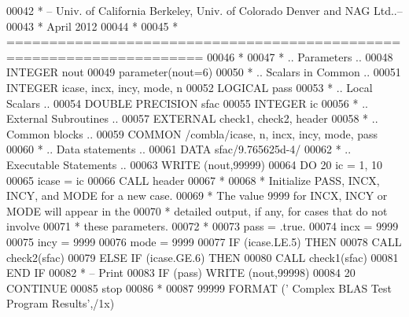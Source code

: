 \begin{DoxyCode}
00042 \textcolor{comment}{*  -- Univ. of California Berkeley, Univ. of Colorado Denver and NAG Ltd..--}
00043 \textcolor{comment}{*     April 2012}
00044 \textcolor{comment}{*}
00045 \textcolor{comment}{*  =====================================================================}
00046 \textcolor{comment}{*}
00047 \textcolor{comment}{*     .. Parameters ..}
00048       \textcolor{keywordtype}{INTEGER}          nout
00049       parameter(nout=6)
00050 \textcolor{comment}{*     .. Scalars in Common ..}
00051       \textcolor{keywordtype}{INTEGER}          icase, incx, incy, mode, n
00052       \textcolor{keywordtype}{LOGICAL}          pass
00053 \textcolor{comment}{*     .. Local Scalars ..}
00054       \textcolor{keywordtype}{DOUBLE PRECISION} sfac
00055       \textcolor{keywordtype}{INTEGER}          ic
00056 \textcolor{comment}{*     .. External Subroutines ..}
00057       \textcolor{keywordtype}{EXTERNAL}         check1, check2, header
00058 \textcolor{comment}{*     .. Common blocks ..}
00059       \textcolor{keyword}{COMMON}           /combla/icase, n, incx, incy, mode, pass
00060 \textcolor{comment}{*     .. Data statements ..}
00061       \textcolor{keyword}{DATA}             sfac/9.765625d-4/
00062 \textcolor{comment}{*     .. Executable Statements ..}
00063       \textcolor{keyword}{WRITE} (nout,99999)
00064       \textcolor{keywordflow}{DO} 20 ic = 1, 10
00065          icase = ic
00066          \textcolor{keyword}{CALL }header
00067 \textcolor{comment}{*}
00068 \textcolor{comment}{*        Initialize PASS, INCX, INCY, and MODE for a new case.}
00069 \textcolor{comment}{*        The value 9999 for INCX, INCY or MODE will appear in the}
00070 \textcolor{comment}{*        detailed  output, if any, for cases that do not involve}
00071 \textcolor{comment}{*        these parameters.}
00072 \textcolor{comment}{*}
00073          pass = .true.
00074          incx = 9999
00075          incy = 9999
00076          mode = 9999
00077          \textcolor{keywordflow}{IF} (icase.LE.5) \textcolor{keywordflow}{THEN}
00078             \textcolor{keyword}{CALL }check2(sfac)
00079          \textcolor{keywordflow}{ELSE} \textcolor{keywordflow}{IF} (icase.GE.6) \textcolor{keywordflow}{THEN}
00080             \textcolor{keyword}{CALL }check1(sfac)
00081 \textcolor{keywordflow}{         END IF}
00082 \textcolor{comment}{*        -- Print}
00083          \textcolor{keywordflow}{IF} (pass) \textcolor{keyword}{WRITE} (nout,99998)
00084    20 \textcolor{keywordflow}{CONTINUE}
00085       stop
00086 \textcolor{comment}{*}
00087 99999 \textcolor{keyword}{FORMAT} (\textcolor{stringliteral}{' Complex BLAS Test Program Results'},/1x)

\end{DoxyCode}
